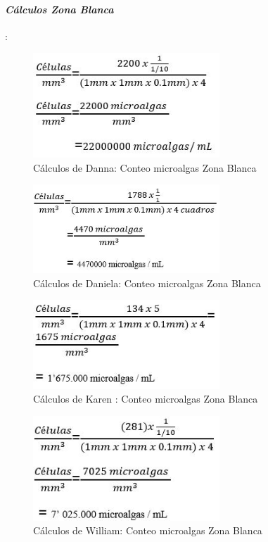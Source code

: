 \documentclass[journal,transmag]{IEEEtran}
\begin{document}
\paragraph{\large \textit{\textbf{Cálculos Zona Blanca}}}: 
	\begin{figure}[!h] 
	\center 
	\includegraphics[width=7cm]{I20.jpg} 
	\caption{Cálculos de Danna: Conteo microalgas Zona Blanca } 
	\label{I1}
	\end{figure} 
	\begin{figure}[!h] 
	\center 
	\includegraphics[width=7cm]{I22.jpg} 
	\caption{Cálculos de Daniela: Conteo microalgas Zona Blanca} 
	\label{I1}
	\end{figure} 
	\begin{figure}[!h] 
	\center 
	\includegraphics[width=7cm]{I24.jpg} 
	\caption{Cálculos de Karen : Conteo microalgas Zona Blanca } 
	\label{I1}
	\end{figure} 
	\begin{figure}[!h] 
	\center 
	\includegraphics[width=7cm]{I26.jpg} 
	\caption{Cálculos de William: Conteo microalgas Zona Blanca } 
	\label{I1}
	\end{figure}
\end{document}

